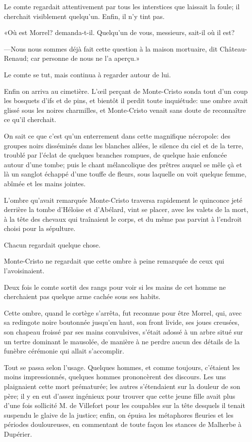 Le comte regardait attentivement par tous les interstices que laissait la foule; il cherchait visiblement quelqu'un. Enfin, il n'y tint pas. 

«Où est Morrel? demanda-t-il. Quelqu'un de vous, messieurs, sait-il où il est? 

—Nous nous sommes déjà fait cette question à la maison mortuaire, dit Château-Renaud; car personne de nous ne l'a aperçu.» 

Le comte se tut, mais continua à regarder autour de lui. 

Enfin on arriva au cimetière. L'œil perçant de Monte-Cristo sonda tout d'un coup les bosquets d'ifs et de pins, et bientôt il perdit toute inquiétude: une ombre avait glissé sous les noires charmilles, et Monte-Cristo venait sans doute de reconnaître ce qu'il cherchait. 

On sait ce que c'est qu'un enterrement dans cette magnifique nécropole: des groupes noirs disséminés dans les blanches allées, le silence du ciel et de la terre, troublé par l'éclat de quelques branches rompues, de quelque haie enfoncée autour d'une tombe; puis le chant mélancolique des prêtres auquel se mêle çà et là un sanglot échappé d'une touffe de fleurs, sous laquelle on voit quelque femme, abîmée et les mains jointes. 

L'ombre qu'avait remarquée Monte-Cristo traversa rapidement le quinconce jeté derrière la tombe d'Héloïse et d'Abélard, vint se placer, avec les valets de la mort, à la tête des chevaux qui traînaient le corps, et du même pas parvint à l'endroit choisi pour la sépulture. 

Chacun regardait quelque chose. 

Monte-Cristo ne regardait que cette ombre à peine remarquée de ceux qui l'avoisinaient. 

Deux fois le comte sortit des rangs pour voir si les mains de cet homme ne cherchaient pas quelque arme cachée sous ses habits. 

Cette ombre, quand le cortège s'arrêta, fut reconnue pour être Morrel, qui, avec sa redingote noire boutonnée jusqu'en haut, son front livide, ses joues creusées, son chapeau froissé par ses mains convulsives, s'était adossé à un arbre situé sur un tertre dominant le mausolée, de manière à ne perdre aucun des détails de la funèbre cérémonie qui allait s'accomplir. 

Tout se passa selon l'usage. Quelques hommes, et comme toujours, c'étaient les moins impressionnés, quelques hommes prononcèrent des discours. Les uns plaignaient cette mort prématurée; les autres s'étendaient sur la douleur de son père; il y en eut d'assez ingénieux pour trouver que cette jeune fille avait plus d'une fois sollicité M. de Villefort pour les coupables sur la tête desquels il tenait suspendu le glaive de la justice; enfin, on épuisa les métaphores fleuries et les périodes douloureuses, en commentant de toute façon les stances de Malherbe à Dupérier. 

